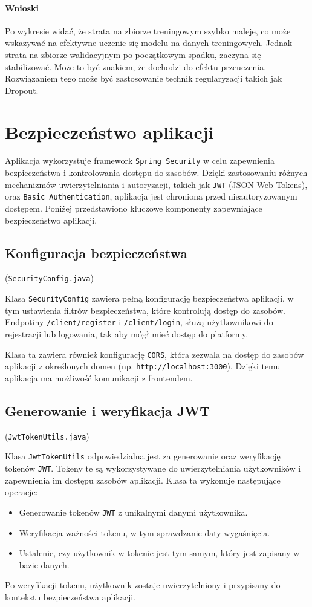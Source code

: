 \paragraph{Wnioski}
Po wykresie widać, że strata na zbiorze treningowym szybko maleje, co może wskazywać na efektywne uczenie się modelu na danych treningowych. Jednak strata na zbiorze walidacyjnym po początkowym spadku, zaczyna się stabilizować. Może to być znakiem, że dochodzi do efektu przeuczenia. Rozwiązaniem tego może być zastosowanie technik regularyzacji takich jak Dropout.

\section{Bezpieczeństwo aplikacji}

Aplikacja wykorzystuje framework \texttt{Spring Security} w celu zapewnienia bezpieczeństwa i kontrolowania dostępu do zasobów. Dzięki zastosowaniu różnych mechanizmów uwierzytelniania i autoryzacji, takich jak \texttt{JWT} (JSON Web Tokens), oraz \texttt{Basic Authentication}, aplikacja jest chroniona przed nieautoryzowanym dostępem. Poniżej przedstawiono kluczowe komponenty zapewniające bezpieczeństwo aplikacji.

\subsection{Konfiguracja bezpieczeństwa} (\texttt{SecurityConfig.java})

Klasa \texttt{SecurityConfig} zawiera pełną konfigurację bezpieczeństwa aplikacji, w tym ustawienia filtrów bezpieczeństwa, które kontrolują dostęp do zasobów. Endpotiny \texttt{/client/register} i \texttt{/client/login}, służą użytkownikowi do rejestracji lub logowania, tak aby mógł mieć dostęp do platformy. 

Klasa ta zawiera również konfigurację \texttt{CORS}, która zezwala na dostęp do zasobów aplikacji z określonych domen (np. \texttt{http://localhost:3000}). Dzięki temu aplikacja ma możliwość komunikacji z frontendem.

\subsection{Generowanie i weryfikacja JWT} (\texttt{JwtTokenUtils.java})

Klasa \texttt{JwtTokenUtils} odpowiedzialna jest za generowanie oraz weryfikację tokenów \texttt{JWT}. Tokeny te są wykorzystywane do uwierzytelniania użytkowników i zapewnienia im dostępu zasobów aplikacji. Klasa ta wykonuje następujące operacje:
\begin{itemize}
    \item Generowanie tokenów \texttt{JWT} z unikalnymi danymi użytkownika.
    \item Weryfikacja ważności tokenu, w tym sprawdzanie daty wygaśnięcia.
    \item Ustalenie, czy użytkownik w tokenie jest tym samym, który jest zapisany w bazie danych.
\end{itemize}
Po weryfikacji tokenu, użytkownik zostaje uwierzytelniony i przypisany do kontekstu bezpieczeństwa aplikacji.

